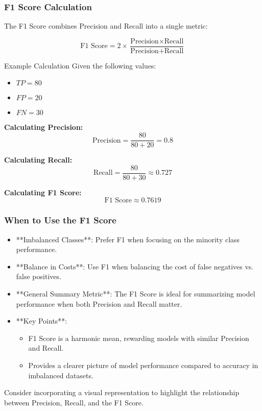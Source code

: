 \documentclass[aspectratio=169]{beamer}
\begin{document}
\begin{frame}[fragile]
  \frametitle{F1 Score Calculation}

  The F1 Score combines Precision and Recall into a single metric:

  \begin{equation}
    \text{F1 Score} = 2 \times \frac{\text{Precision} \times \text{Recall}}{\text{Precision} + \text{Recall}}
  \end{equation}

  \begin{block}{Example Calculation}
    Given the following values:
    \begin{itemize}
      \item \( TP = 80 \)
      \item \( FP = 20 \)
      \item \( FN = 30 \)
    \end{itemize}

    \textbf{Calculating Precision:}
    \begin{equation}
      \text{Precision} = \frac{80}{80 + 20} = 0.8
    \end{equation}

    \textbf{Calculating Recall:}
    \begin{equation}
      \text{Recall} = \frac{80}{80 + 30} \approx 0.727
    \end{equation}

    \textbf{Calculating F1 Score:}
    \begin{equation}
      \text{F1 Score} \approx 0.7619
    \end{equation}
  \end{block}
\end{frame}

\begin{frame}[fragile]
  \frametitle{When to Use the F1 Score}

  \begin{itemize}
    \item **Imbalanced Classes**: Prefer F1 when focusing on the minority class performance.
    
    \item **Balance in Costs**: Use F1 when balancing the cost of false negatives vs. false positives. 

    \item **General Summary Metric**: The F1 Score is ideal for summarizing model performance when both Precision and Recall matter.

    \item **Key Points**:
    \begin{itemize}
      \item F1 Score is a harmonic mean, rewarding models with similar Precision and Recall.
      \item Provides a clearer picture of model performance compared to accuracy in imbalanced datasets.
    \end{itemize}
  \end{itemize}

  Consider incorporating a visual representation to highlight the relationship between Precision, Recall, and the F1 Score.
\end{frame}
\end{document}

